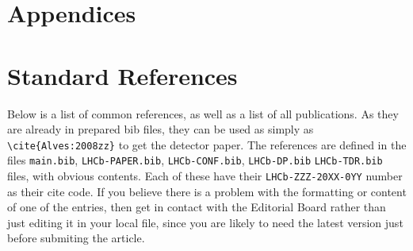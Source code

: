 
\section*{Appendices}

\appendix

\section{Standard References}
\label{sec:StandardReferences}
Below is a list of common references, as
well as a list of all \lhcb publications. 
As they are already in prepared bib files, they can be used as simply as
\texttt{\textbackslash cite\{Alves:2008zz\}} to get the \lhcb detector paper. 
The references are defined in the files \texttt{main.bib},  \texttt{LHCb-PAPER.bib},
\texttt{LHCb-CONF.bib}, \texttt{LHCb-DP.bib} \texttt{LHCb-TDR.bib} files, with obvious contents.
Each of these have their \texttt{LHCb-ZZZ-20XX-0YY} number as their cite code.
If you believe there is a problem with the formatting or
content of one of the entries, then get in contact with the Editorial
Board rather than just editing it in your local file,
since you are likely to need the latest version just before submiting the article.


